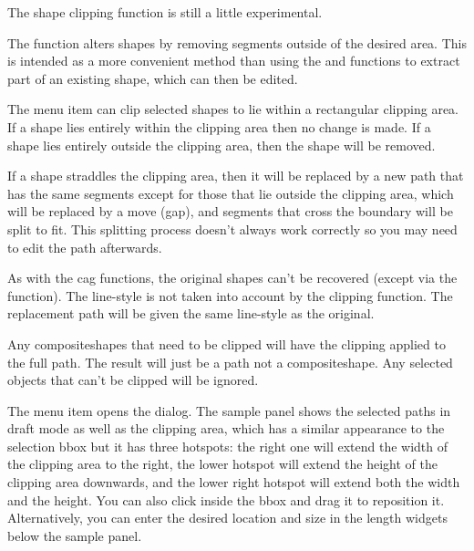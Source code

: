 \begin{information}
The shape clipping function is still a little experimental.
\end{information}

The  function alters \glspl{shape} by removing
segments outside of the desired area. This is intended as a more
convenient method than using the  and
 functions to extract part
of an existing shape, which can then be edited.


The  menu item can clip selected \glspl{shape}
to lie within a rectangular clipping area. If a \gls{shape} lies
entirely within the clipping area then no change is made.
If a \gls{shape} lies entirely outside the clipping area, then the
shape will be removed.

If a \gls{shape} straddles the clipping area, then it will be
replaced by a new \gls{path} that has the same segments except for
those that lie outside the clipping area, which will be replaced by
a move (gap), and segments that cross the boundary will be split to
fit.
This splitting process doesn't always work correctly so you may need
to edit the path afterwards.

\begin{important}
As with the \gls{cag} functions, the original \glspl{shape} can't be
recovered (except via the  function).
The \gls{line-style} is not taken into account by the clipping
function. The replacement path will be given the same
\gls{line-style} as the original.
\end{important}

Any \glspl{compositeshape} that need to be clipped will have the
clipping applied to the full path. The result will just be a
\gls{path} not a \gls{compositeshape}. Any selected objects that
can't be clipped will be ignored.


The  menu item opens the  dialog.
The sample panel shows the selected paths in draft mode as well as the clipping
area, which has a similar appearance to the selection \gls{bbox}
but it has three hotspots: the right one will extend the width of
the clipping area to the right, the lower hotspot will extend the
height of the clipping area downwards, and the lower right hotspot
will extend both the width and the height. You can also click inside
the \gls{bbox} and drag it to reposition it. Alternatively, you can
enter the desired location and size in the length widgets below the
sample panel.

